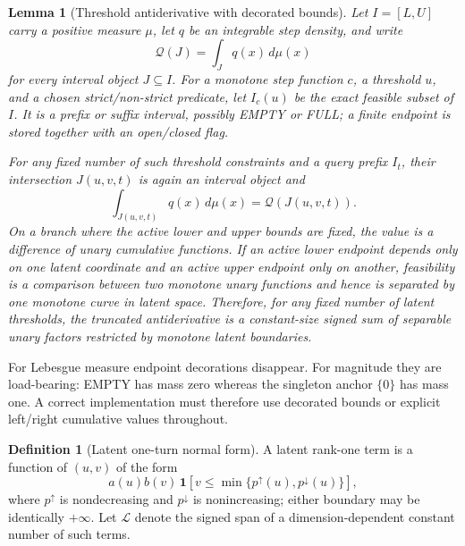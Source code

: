 \documentclass[12pt,a4paper]{article}
\newtheorem{lemma}[theorem]{Lemma}
\theoremstyle{definition}
\newtheorem{definition}[theorem]{Definition}
\newcommand{\1}{\mathbf 1}
\begin{document}
\begin{lemma}[Threshold antiderivative with decorated bounds]   \label{lem:threshold}
Let $I=[L,U]$ carry a positive measure $\mu$, let $q$ be an integrable step density, and write
\[
\mathcal Q(J)=\int_Jq(x)\,d\mu(x)
\]
for every interval object $J\subseteq I$.  For a monotone step function $c$, a threshold $u$, and a chosen strict/non-strict predicate, let $I_c(u)$ be the exact feasible subset of $I$.  It is a prefix or suffix interval, possibly EMPTY or FULL; a finite endpoint is stored together with an open/closed flag.

For any fixed number of such threshold constraints and a query prefix $I_t$, their intersection $J(u,v,t)$ is again an interval object and
\begin{equation}
\boxed{\int_{J(u,v,t)}q(x)\,d\mu(x)=\mathcal Q(J(u,v,t)).}      \label{eq:intervalthreshold}
\end{equation}
On a branch where the active lower and upper bounds are fixed, the value is a difference of unary cumulative functions.  If an active lower endpoint depends only on one latent coordinate and an active upper endpoint only on another, feasibility is a comparison between two monotone unary functions and hence is separated by one monotone curve in latent space.  Therefore, for any fixed number of latent thresholds, the truncated antiderivative is a constant-size signed sum of separable unary factors restricted by monotone latent boundaries.
\end{lemma}

For Lebesgue measure endpoint decorations disappear.  For magnitude they are load-bearing: EMPTY has mass zero whereas the singleton anchor $\{0\}$ has mass one.  A correct implementation must therefore use decorated bounds or explicit left/right cumulative values throughout.

\begin{definition}[Latent one-turn normal form]                  \label{def:latent}
A latent rank-one term is a function of $(u,v)$ of the form
\begin{equation}
a(u)b(v)\,\1[v\le \min\{p^\uparrow(u),p^\downarrow(u)\}],     \label{eq:latentterm}
\end{equation}
where $p^\uparrow$ is nondecreasing and $p^\downarrow$ is nonincreasing; either boundary may be identically $+\infty$. Let $\mathcal L$ denote the signed span of a dimension-dependent constant number of such terms.
\end{definition}
\end{document}
